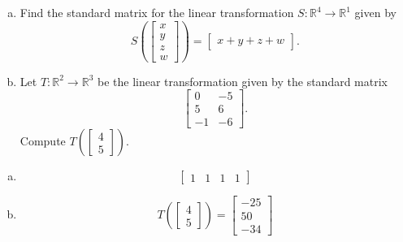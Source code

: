 
\begin{exerciseStatement}

\begin{enumerate}[(a)]
\item Find the standard matrix for the linear transformation \(S:\mathbb{R}^ 4  \to \mathbb{R}^ 1 \) given by \[S\left(  \left[\begin{array}{c}
x \\
y \\
z \\
{w}
\end{array}\right]  \right) =  \left[\begin{array}{c}
x + y + z + {w}
\end{array}\right] .\]
\item Let \(T:\mathbb{R}^ 2  \to \mathbb{R}^ 3 \) be the linear transformation given by the standard matrix \[ \left[\begin{array}{cc}
0 & -5 \\
5 & 6 \\
-1 & -6
\end{array}\right] .\] Compute \(T\left( \left[\begin{array}{c}
4 \\
5
\end{array}\right]  \right)\). 
\end{enumerate}
    
\end{exerciseStatement}
    
\begin{exerciseAnswer} 

\begin{enumerate}[(a)]
\item \[ \left[\begin{array}{cccc}
1 & 1 & 1 & 1
\end{array}\right] \]
\item \[T\left( \left[\begin{array}{c}
4 \\
5
\end{array}\right]  \right)= \left[\begin{array}{c}
-25 \\
50 \\
-34
\end{array}\right] \]
\end{enumerate}
    
\end{exerciseAnswer}
    

